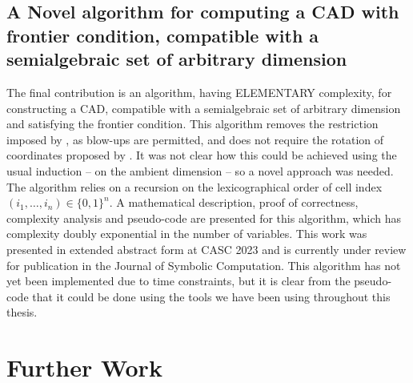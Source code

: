 \documentclass[
]{book}
\theoremstyle{definition}
\theoremstyle{definition}
\theoremstyle{definition}
\theoremstyle{definition}
\theoremstyle{remark}
\begin{document}
\hypertarget{a-novel-algorithm-for-computing-a-cad-with-frontier-condition-compatible-with-a-semialgebraic-set-of-arbitrary-dimension}{%
\subsection{A Novel algorithm for computing a CAD with frontier condition, compatible with a semialgebraic set of arbitrary dimension}\label{a-novel-algorithm-for-computing-a-cad-with-frontier-condition-compatible-with-a-semialgebraic-set-of-arbitrary-dimension}}

The final contribution is an algorithm, having ELEMENTARY complexity, for constructing a CAD, compatible with a semialgebraic set of arbitrary dimension and satisfying the frontier condition.
This algorithm removes the restriction imposed by \citet{jhd20}, as blow-ups are permitted, and does not require the rotation of coordinates proposed by \citet{pianomovers1983}.
It was not clear how this could be achieved using the usual induction -- on the ambient dimension -- so a novel approach was needed. The algorithm relies on a recursion on the lexicographical order of cell index \((i_1,\ldots,i_n) \in \{0,1\}^n\). A mathematical description, proof of correctness, complexity analysis and pseudo-code are presented for this algorithm, which has complexity doubly exponential in the number of variables.
This work was presented in extended abstract form at CASC 2023 and is currently under review for publication in the Journal of Symbolic Computation.
This algorithm has not yet been implemented due to time constraints, but it is clear from the pseudo-code that it could be done using the tools we have been using throughout this thesis.

\hypertarget{further-work}{%
\section{Further Work}\label{further-work}}
\end{document}
